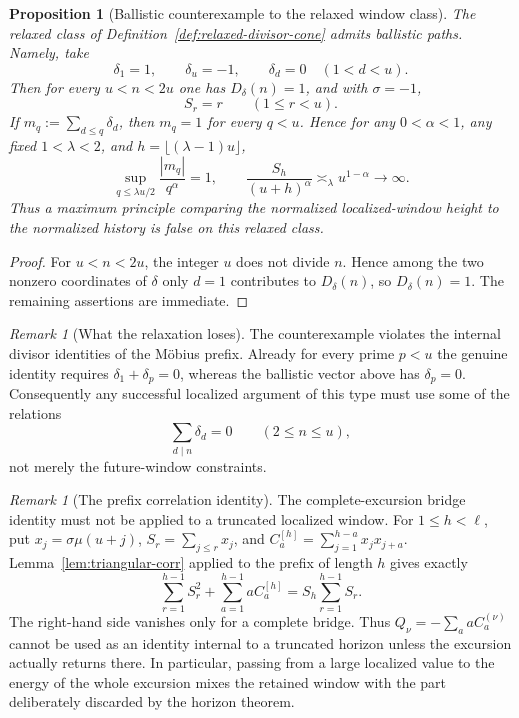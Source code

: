 \documentclass[11pt]{amsart}
\numberwithin{equation}{section}
\theoremstyle{plain}
\newtheorem{proposition}[theorem]{Proposition}
\theoremstyle{definition}
\theoremstyle{remark}
\newtheorem{remark}[theorem]{Remark}
\begin{document}
\begin{proposition}[Ballistic counterexample to the relaxed window class]
\label{prop:relaxed-ballistic}
The relaxed class of Definition~\ref{def:relaxed-divisor-cone} admits
ballistic paths.  Namely, take
\[
\delta_1=1,\qquad\delta_u=-1,\qquad\delta_d=0\quad(1<d<u).
\]
Then for every $u<n<2u$ one has $D_\delta(n)=1$, and with $\sigma=-1$,
\[
S_r=r\qquad(1\le r<u).
\]
If $m_q:=\sum_{d\le q}\delta_d$, then $m_q=1$ for every $q<u$.  Hence for
any $0<\alpha<1$, any fixed $1<\lambda<2$, and
$h=\lfloor(\lambda-1)u\rfloor$,
\[
\sup_{q\le\lambda u/2}\frac{|m_q|}{q^\alpha}=1,
\qquad
\frac{S_h}{(u+h)^\alpha}\asymp_\lambda u^{1-\alpha}\longrightarrow\infty.
\]
Thus a maximum principle comparing the normalized localized-window height
to the normalized history is false on this relaxed class.
\end{proposition}

\begin{proof}
For $u<n<2u$, the integer $u$ does not divide $n$.  Hence among the two
nonzero coordinates of $\delta$ only $d=1$ contributes to $D_\delta(n)$,
so $D_\delta(n)=1$.  The remaining assertions are immediate.
\end{proof}

\begin{remark}[What the relaxation loses]
\label{rem:relaxed-loses}
The counterexample violates the internal divisor identities of the M\"obius
prefix.  Already for every prime $p<u$ the genuine identity requires
$\delta_1+\delta_p=0$, whereas the ballistic vector above has
$\delta_p=0$.  Consequently any successful localized argument of this type
must use some of the relations
\[
\sum_{d\mid n}\delta_d=0\qquad(2\le n\le u),
\]
not merely the future-window constraints.
\end{remark}

\begin{remark}[The prefix correlation identity]
\label{rem:prefix-correlation}
The complete-excursion bridge identity must not be applied to a truncated
localized window.  For $1\le h<\ell$, put
$x_j=\sigma\mu(u+j)$,
$S_r=\sum_{j\le r}x_j$, and
$C_a^{[h]}=\sum_{j=1}^{h-a}x_jx_{j+a}$.  Lemma~\ref{lem:triangular-corr}
applied to the prefix of length $h$ gives exactly
\[
\sum_{r=1}^{h-1}S_r^2+\sum_{a=1}^{h-1}aC_a^{[h]}
=S_h\sum_{r=1}^{h-1}S_r.
\]
The right-hand side vanishes only for a complete bridge.  Thus
$Q_\nu=-\sum_a aC_a^{(\nu)}$ cannot be used as an identity internal to a
truncated horizon unless the excursion actually returns there.  In
particular, passing from a large localized value to the energy of the whole
excursion mixes the retained window with the part deliberately discarded by
the horizon theorem.
\end{remark}
\end{document}
